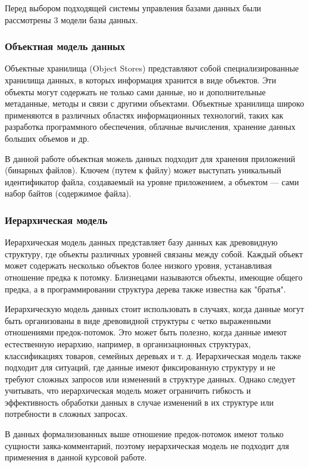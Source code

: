Перед выбором подходящей системы управления базами данных были рассмотрены 3 модели базы данных.

\subsubsection{Объектная модель данных}

Объектные хранилища (Object Stores) представляют собой специализированные хранилища данных, в которых информация хранится в виде объектов. Эти объекты могут содержать не только сами данные, но и дополнительные метаданные, методы и связи с другими объектами. Объектные хранилища широко применяются в различных областях информационных технологий, таких как разработка программного обеспечения, облачные вычисления, хранение данных больших объемов и др.


В данной работе объектная можель данных подходит для хранения приложений (бинарных файлов).  Ключем (путем к файлу) может выступать уникальный идентификатор файла, создаваемый на уровне приложением, а объектом --- сами набор байтов (содержимое файла).

\subsubsection{Иерархическая модель}

Иерархическая модель данных представляет базу данных как древовидную структуру, где объекты различных уровней связаны между собой. Каждый объект может содержать несколько объектов более низкого уровня, устанавливая отношение предка к потомку. Близнецами называются объекты, имеющие общего предка, а в программировании структура дерева также известна как "братья".

Иерархическую модель данных стоит использовать в случаях, когда данные могут быть организованы в виде древовидной структуры с четко выраженными отношениями предок-потомок. Это может быть полезно, когда данные имеют естественную иерархию, например, в организационных структурах, классификациях товаров, семейных деревьях и т. д. Иерархическая модель также подходит для ситуаций, где данные имеют фиксированную структуру и не требуют сложных запросов или изменений в структуре данных. Однако следует учитывать, что иерархическая модель может ограничить гибкость и эффективность обработки данных в случае изменений в их структуре или потребности в сложных запросах. 

В данных формализованных выше отношение предок-потомок имеют только сущности заяка-комментарий, поэтому иерархическая модель не подходит для применения в данной курсовой работе.

